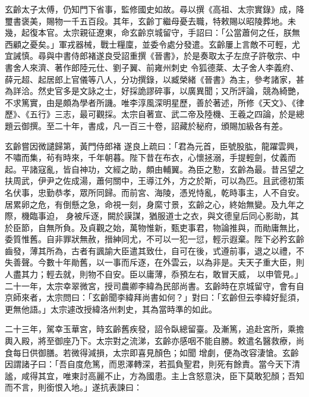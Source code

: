 \begin{pinyinscope}
 玄齡太子太傅，仍知門下省事，監修國史如故。尋以撰《高祖、太宗實錄》成，降璽書褒美，賜物一千五百段。其年，玄齡丁繼母憂去職，特敕賜以昭陵葬地。未幾，起復本官。太宗親征遼東，命玄齡京城留守，手詔曰：「公當蕭何之任，朕無西顧之憂矣。」軍戎器械，戰士糧廩，並委令處分發遣。玄齡屢上言敵不可輕，尤宜誡慎。尋與中書侍郎褚遂良受詔重撰《晉書》，於是奏取太子左庶子許敬宗、中書舍人來濟、著作郎陸元仕、劉子翼、前雍州刺史
 令狐德棻、太子舍人李義府、薛元超、起居郎上官儀等八人，分功撰錄，以臧榮緒《晉書》為主，參考諸家，甚為詳洽。然史官多是文詠之士，好採詭謬碎事，以廣異聞；又所評論，競為綺艷，不求篤實，由是頗為學者所譏。唯李淳風深明星歷，善於著述，所修《天文》、《律歷》、《五行》三志，最可觀採。太宗自著宣、武二帝及陸機、王羲之四論，於是總題云御撰。至二十年，書成，凡一百三十卷，詔藏於秘府，頒賜加級各有差。



 玄齡嘗因微譴歸第，黃門侍郎褚
 遂良上疏曰：「君為元首，臣號股肱，龍躍雲興，不嘯而集，茍有時來，千年朝暮。陛下昔在布衣，心懷拯溺，手提輕劍，仗義而起。平諸寇亂，皆自神功，文經之助，頗由輔翼。為臣之懃，玄齡為最。昔呂望之扶周武，伊尹之佐成湯，蕭何關中，王導江外，方之於斯，可以為匹。且武德初策名伏事，忠勤恭孝，眾所同歸。而前宮、海陵，憑兇恃亂，乾時事主，人不自安。居累卵之危，有倒懸之急，命視一刻，身縻寸景，玄齡之心，終始無變。及九年之際，機臨事迫，
 身被斥逐，闕於謨謀，猶服道士之衣，與文德皇后同心影助，其於臣節，自無所負。及貞觀之始，萬物惟新，甄吏事君，物論推與，而勛庸無比，委質惟舊。自非罪狀無赦，搢紳同尤，不可以一犯一愆，輕示遐棄。陛下必矜玄齡齒發，薄其所為，古者有諷諭大臣遣其致仕，自可在後，式遵前事，退之以禮，不失善聲。今數十年勛舊，以一事而斥逐，在外雲云，以為非是。夫天子重大臣，則人盡其力；輕去就，則物不自安。臣以庸薄，忝預左右，敢冒天威，
 以申管見。」二十一年，太宗幸翠微宮，授司農卿李緯為民部尚書。玄齡時在京城留守，會有自京師來者，太宗問曰：「玄齡聞李緯拜尚書如何？」對曰：「玄齡但云李緯好髭須，更無他語。」太宗遽改授緯洛州刺史，其為當時準的如此。



 二十三年，駕幸玉華宮，時玄齡舊疾發，詔令臥總留臺。及漸篤，追赴宮所，乘擔輿入殿，將至御座乃下。太宗對之流涕，玄齡亦感咽不能自勝。敕遣名醫救療，尚食每日供御膳。若微得減損，太宗即喜見顏色；如聞
 增劇，便為改容淒愴。玄齡因謂諸子曰：「吾自度危篤，而恩澤轉深，若孤負聖君，則死有餘責。當今天下清謐，咸得其宜，唯東討高麗不止，方為國患。主上含怒意決，臣下莫敢犯顏；吾知而不言，則銜恨入地。」遂抗表諫曰：




\end{pinyinscope}
